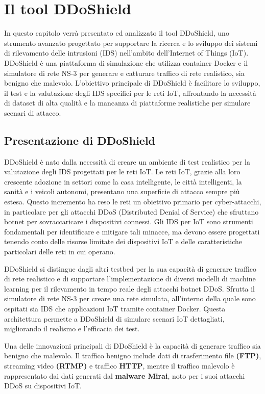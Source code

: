 \chapter{Il tool DDoShield}

In questo capitolo verrà presentato ed analizzato il tool DDoShield, uno strumento avanzato progettato per supportare la ricerca e lo sviluppo dei sistemi di rilevamento delle intrusioni (IDS) nell'ambito dell'Internet of Things (IoT). DDoShield è una piattaforma di simulazione che utilizza container Docker e il simulatore di rete NS-3 per generare e catturare traffico di rete realistico, sia benigno che malevolo. L'obiettivo principale di DDoShield è facilitare lo sviluppo, il test e la valutazione degli IDS specifici per le reti IoT, affrontando la necessità di dataset di alta qualità e la mancanza di piattaforme realistiche per simulare scenari di attacco.

\section{Presentazione di DDoShield}

DDoShield è nato dalla necessità di creare un ambiente di test realistico per la valutazione degli IDS progettati per le reti IoT. Le reti IoT, grazie alla loro crescente adozione in settori come la casa intelligente, le città intelligenti, la sanità e i veicoli autonomi, presentano una superficie di attacco sempre più estesa. Questo incremento ha reso le reti un obiettivo primario per cyber-attacchi, in particolare per gli attacchi DDoS (Distributed Denial of Service) che sfruttano botnet per sovraccaricare i dispositivi connessi. Gli IDS per IoT sono strumenti fondamentali per identificare e mitigare tali minacce, ma devono essere progettati tenendo conto delle risorse limitate dei dispositivi IoT e delle caratteristiche particolari delle reti in cui operano.

DDoShield si distingue dagli altri testbed per la sua capacità di generare traffico di rete realistico e di supportare l'implementazione di diversi modelli di machine learning per il rilevamento in tempo reale degli attacchi botnet DDoS. Sfrutta il simulatore di rete NS-3 per creare una rete simulata, all'interno della quale sono ospitati sia IDS che applicazioni IoT tramite container Docker. Questa architettura permette a DDoShield di simulare scenari IoT dettagliati, migliorando il realismo e l'efficacia dei test.

Una delle innovazioni principali di DDoShield è la capacità di generare traffico sia benigno che malevolo. Il traffico benigno include dati di trasferimento file \textbf{(FTP)}, streaming video \textbf{(RTMP)} e traffico \textbf{HTTP}, mentre il traffico malevolo è rappresentato dai dati generati dal \textbf{malware Mirai}, noto per i suoi attacchi DDoS su dispositivi IoT.


